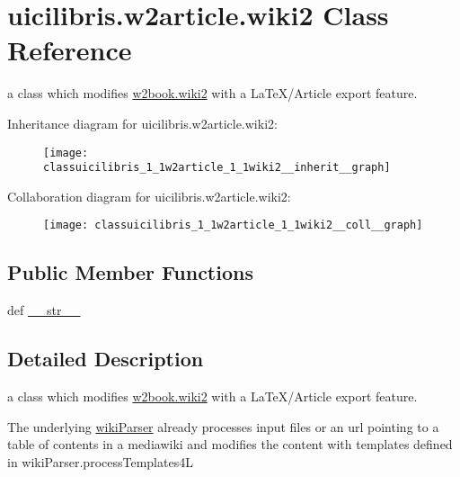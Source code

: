 \hypertarget{classuicilibris_1_1w2article_1_1wiki2}{\section{uicilibris.\-w2article.\-wiki2 \-Class \-Reference}
\label{classuicilibris_1_1w2article_1_1wiki2}
}


a class which modifies \hyperlink{classuicilibris_1_1w2book_1_1wiki2}{w2book.\-wiki2} with a \-La\-Te\-X/\-Article export feature.  




\-Inheritance diagram for uicilibris.\-w2article.\-wiki2\-:
\nopagebreak
\begin{figure}[H]
\begin{center}
\leavevmode
\texttt{[image: classuicilibris\_1\_1w2article\_1\_1wiki2\_\_inherit\_\_graph]}
\end{center}
\end{figure}


\-Collaboration diagram for uicilibris.\-w2article.\-wiki2\-:
\nopagebreak
\begin{figure}[H]
\begin{center}
\leavevmode
\texttt{[image: classuicilibris\_1\_1w2article\_1\_1wiki2\_\_coll\_\_graph]}
\end{center}
\end{figure}
\subsection*{\-Public \-Member \-Functions}
\begin{DoxyCompactItemize}
\item 
def \hyperlink{classuicilibris_1_1w2article_1_1wiki2_af05069c6f9b62a40cb0ca4fb142769c9}{\-\_\-\-\_\-str\-\_\-\-\_\-}
\end{DoxyCompactItemize}


\subsection{\-Detailed \-Description}
a class which modifies \hyperlink{classuicilibris_1_1w2book_1_1wiki2}{w2book.\-wiki2} with a \-La\-Te\-X/\-Article export feature. 

\-The underlying \hyperlink{namespaceuicilibris_1_1wikiParser}{wiki\-Parser} already processes input files or an url pointing to a table of contents in a mediawiki and modifies the content with templates defined in wiki\-Parser.\-process\-Templates4\-L 

